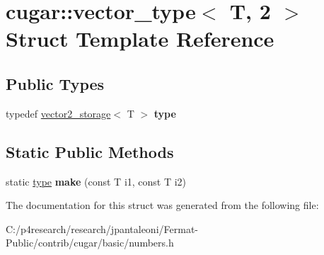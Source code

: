 \hypertarget{structcugar_1_1vector__type_3_01_t_00_012_01_4}{}\section{cugar\+:\+:vector\+\_\+type$<$ T, 2 $>$ Struct Template Reference}
\label{structcugar_1_1vector__type_3_01_t_00_012_01_4}
\subsection*{Public Types}
\begin{DoxyCompactItemize}
\item 
\mbox{\label{structcugar_1_1vector__type_3_01_t_00_012_01_4_a65f6548f1c8d027f47129ae672a8523f}} 
typedef \hyperlink{structcugar_1_1vector2__storage}{vector2\+\_\+storage}$<$ T $>$ {\bfseries type}
\end{DoxyCompactItemize}
\subsection*{Static Public Methods}
\begin{DoxyCompactItemize}
\item 
\mbox{\label{structcugar_1_1vector__type_3_01_t_00_012_01_4_a442d7851d252a1771eae740aa7a536f7}} 
static \hyperlink{structcugar_1_1vector2__storage}{type} {\bfseries make} (const T i1, const T i2)
\end{DoxyCompactItemize}


The documentation for this struct was generated from the following file\+:\begin{DoxyCompactItemize}
\item 
C\+:/p4research/research/jpantaleoni/\+Fermat-\/\+Public/contrib/cugar/basic/numbers.\+h\end{DoxyCompactItemize}

